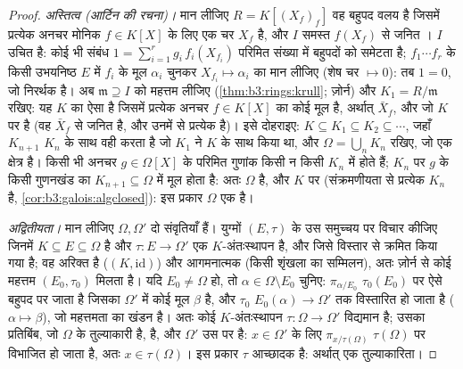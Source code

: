 \begin{proof}
\emph{अस्तित्व (आर्टिन की रचना)।} मान लीजिए $R = K[(X_f)_f]$ वह बहुपद वलय
है जिसमें प्रत्येक अनचर मोनिक $f \in K[X]$ के लिए एक चर $X_f$ है, और
$I$ समस्त $f(X_f)$ से जनित । $I$ उचित है: कोई भी संबंध
$1 = \sum_{i=1}^r g_i\,
f_i(X_{f_i})$ परिमित संख्या में बहुपदों को समेटता है; $f_1\cdots f_r$ के किसी
उभयनिष्ठ  $E$ में $f_i$ के मूल $\alpha_i$ चुनकर
$X_{f_i} \mapsto \alpha_i$ का मान लीजिए (शेष चर $\mapsto 0$): तब $1 = 0$, जो निरर्थक है। अब
$\mathfrak m \supseteq I$ को महत्तम लीजिए (\cref{thm:b3:rings:krull}; ज़ोर्न) और $K_1 = R/\mathfrak
m$ रखिए: यह $K$
का ऐसा  है जिसमें प्रत्येक अनचर $f \in
K[X]$ का कोई मूल
है, अर्थात् $\bar X_f$, और जो $K$ पर  है (वह $\bar X_f$ से जनित है,
और उनमें से प्रत्येक  है)। इसे दोहराइए: $K \subseteq K_1 \subseteq K_2 \subseteq \cdots$, जहाँ $K_{n+1}$
$K_n$ के साथ वही करता है जो $K_1$ ने $K$ के साथ किया था, और
$\Omega =
\bigcup_n K_n$ रखिए, जो एक क्षेत्र है। किसी भी अनचर $g \in \Omega[X]$ के परिमित
गुणांक किसी न किसी $K_n$ में होते हैं; $K_n$ पर $g$ के किसी
 गुणनखंड का $K_{n+1} \subseteq
\Omega$ में मूल होता है: अतः $\Omega$  है, और $K$ पर  (संक्रमणीयता से प्रत्येक $K_n$ 
है, \cref{cor:b3:galois:algclosed}): इस प्रकार $\Omega$ एक  है।

\emph{अद्वितीयता।} मान लीजिए $\Omega, \Omega'$ दो  संवृतियाँ हैं।
युग्मों $(E, \tau)$ के उस समुच्चय पर विचार कीजिए जिनमें $K
\subseteq E \subseteq \Omega$ है और
$\tau\colon E \to \Omega'$ एक $K$-अंतःस्थापन है, और जिसे विस्तार से क्रमित किया गया
है; वह अरिक्त है ($(K,
\mathrm{id})$) और आगमनात्मक (किसी शृंखला का सम्मिलन),
अतः ज़ोर्न से कोई महत्तम $(E_0, \tau_0)$ मिलता है। यदि $E_0 \neq \Omega$ हो, तो $\alpha \in
\Omega\setminus E_0$
चुनिए: $\pi_{\alpha/E_0}$ $\tau_0(E_0)$ पर ऐसे बहुपद पर जाता है जिसका  $\Omega'$ में कोई मूल $\beta$ है, और $\tau_0$ $E_0(\alpha) \to
\Omega'$ तक विस्तारित हो
जाता है ($\alpha \mapsto \beta$), जो महत्तमता का खंडन है। अतः कोई
$K$-अंतःस्थापन $\tau \colon \Omega \to \Omega'$ विद्यमान है; उसका प्रतिबिंब, जो $\Omega$ के
तुल्याकारी है,  है, और $\Omega'$ उस पर  है:
$x \in \Omega'$ के लिए $\pi_{x/\tau(\Omega)}$ $\tau(\Omega)$ पर विभाजित हो जाता है, अतः $x \in
\tau(\Omega)$। इस
प्रकार $\tau$ आच्छादक है: अर्थात् एक तुल्याकारिता।
\end{proof}

